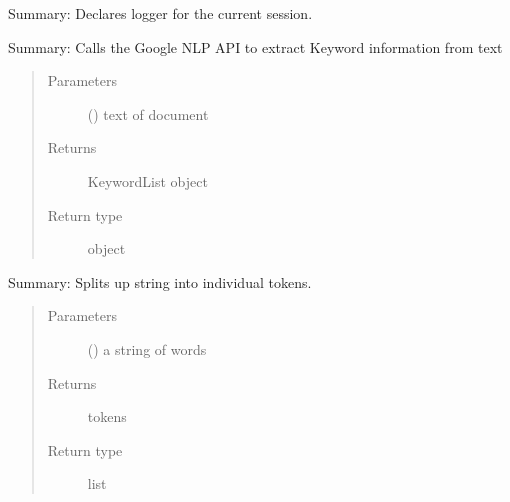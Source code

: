 \documentclass[letterpaper,10pt,english]{sphinxmanual}
\begin{document}

\begin{fulllineitems}
\label{\detokenize{functionsv1:analyze_functions.declarelogger}}
Summary: Declares logger for the current session.

\end{fulllineitems}


\begin{fulllineitems}
\label{\detokenize{functionsv1:analyze_functions.identifykeywords}}
Summary: Calls the Google NLP API to extract Keyword information from text
\begin{quote}\begin{description}
\item[{Parameters}] \leavevmode
{} () \textendash{} text of document

\item[{Returns}] \leavevmode
KeywordList object

\item[{Return type}] \leavevmode
object

\end{description}\end{quote}

\end{fulllineitems}


\begin{fulllineitems}
\label{\detokenize{functionsv1:analyze_functions.tokenize}}
Summary: Splits up string into individual tokens.
\begin{quote}\begin{description}
\item[{Parameters}] \leavevmode
{} () \textendash{} a string of words

\item[{Returns}] \leavevmode
tokens

\item[{Return type}] \leavevmode
list

\end{description}\end{quote}

\end{fulllineitems}
\end{document}
